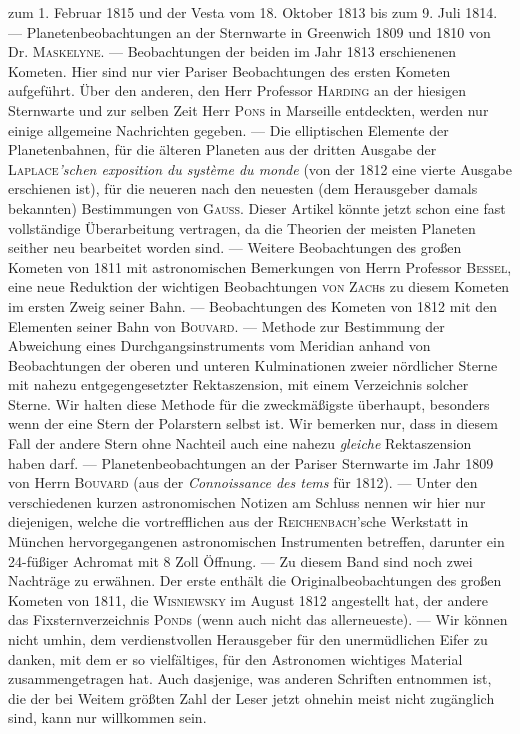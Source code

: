 zum 1. Februar 1815 und der Vesta vom 18. Oktober 1813 bis zum 9. Juli 1814. — Planetenbeobachtungen an der Sternwarte in Greenwich 1809 und 1810 von Dr. \textsc{Maskelyne}. — Beobachtungen der beiden im Jahr 1813 erschienenen Kometen. Hier sind nur vier Pariser Beobachtungen des ersten Kometen aufgeführt. Über den anderen, den Herr Professor \textsc{Harding} an der hiesigen Sternwarte und zur selben Zeit Herr \textsc{Pons} in Marseille entdeckten, werden nur einige allgemeine Nachrichten gegeben. — Die elliptischen Elemente der Planetenbahnen, für die älteren Planeten aus der dritten Ausgabe der \textsc{Laplace}\emph{'schen exposition du système du monde} (von der 1812 eine vierte Ausgabe erschienen ist), für die neueren nach den neuesten (dem Herausgeber damals bekannten) Bestimmungen von \textsc{Gauss}. Dieser Artikel könnte jetzt schon eine fast vollständige Überarbeitung vertragen, da die Theorien der meisten Planeten seither neu bearbeitet worden sind. — Weitere Beobachtungen des großen Kometen von 1811 mit astronomischen Bemerkungen von Herrn Professor \textsc{Bessel}, eine neue Reduktion der wichtigen Beobachtungen \textsc{von Zach}s zu diesem Kometen im ersten Zweig seiner Bahn. — Beobachtungen des Kometen von 1812 mit den Elementen seiner Bahn von \textsc{Bouvard}. — Methode zur Bestimmung der Abweichung eines Durchgangsinstruments vom Meridian anhand von Beobachtungen der oberen und unteren Kulminationen zweier nördlicher Sterne mit nahezu entgegengesetzter Rektaszension, mit einem Verzeichnis solcher Sterne. Wir halten diese Methode für die zweckmäßigste überhaupt, besonders wenn der eine Stern der Polarstern selbst ist. Wir bemerken nur, dass in diesem Fall der andere Stern ohne Nachteil auch eine nahezu \emph{gleiche} Rektaszension haben darf. — Planetenbeobachtungen an der Pariser Sternwarte im Jahr 1809 von Herrn \textsc{Bouvard} (aus der \emph{Connoissance des tems} für 1812). — Unter den verschiedenen kurzen astronomischen Notizen am Schluss nennen wir hier nur diejenigen, welche die vortrefflichen aus der \textsc{Reichenbach}'sche Werkstatt in München hervorgegangenen astronomischen Instrumenten betreffen, darunter ein 24-füßiger Achromat mit 8 Zoll Öffnung. — Zu diesem Band sind noch zwei Nachträge zu erwähnen. Der erste enthält die Originalbeobachtungen des großen Kometen von 1811, die \textsc{Wisniewsky} im August 1812 angestellt hat, der andere das Fixsternverzeichnis \textsc{Pond}s (wenn auch nicht das allerneueste). — Wir können nicht umhin, dem verdienstvollen Herausgeber für den unermüdlichen Eifer zu danken, mit dem er so vielfältiges, für den Astronomen wichtiges Material zusammengetragen hat. Auch dasjenige, was anderen Schriften entnommen ist, die der bei Weitem größten Zahl der Leser jetzt ohnehin meist nicht zugänglich sind, kann nur willkommen sein.

